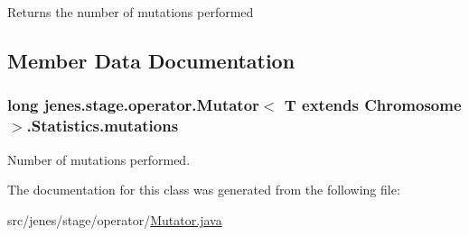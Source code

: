 \begin{DoxyReturn}{Returns}
the number of mutations performed 
\end{DoxyReturn}


\subsection{Member Data Documentation}
\hypertarget{classjenes_1_1stage_1_1operator_1_1_mutator_3_01_t_01extends_01_chromosome_01_4_1_1_statistics_a4328be89d9643f783f5c08164a0aa916}{
\subsubsection[{mutations}]{\setlength{\rightskip}{0pt plus 5cm}long jenes.\-stage.\-operator.\-Mutator$<$ T extends Chromosome $>$.Statistics.\-mutations\hspace{0.3cm}{\ttfamily [protected]}}}\label{classjenes_1_1stage_1_1operator_1_1_mutator_3_01_t_01extends_01_chromosome_01_4_1_1_statistics_a4328be89d9643f783f5c08164a0aa916}
Number of mutations performed. 

The documentation for this class was generated from the following file\-:\begin{DoxyCompactItemize}
\item 
src/jenes/stage/operator/\hyperlink{_mutator_8java}{Mutator.\-java}\end{DoxyCompactItemize}

